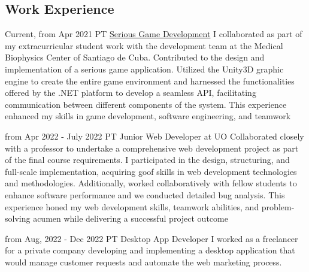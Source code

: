 \documentclass[10pt]{curriculum}
\begin{document}
\begin{paracol}{2}


\section{Work Experience}





\jobentry
	{Current, from Apr 2021} %
	{PT} %
	{} %
	{\href{https://www.cent.uo.edu.cu/cbm/483-2/}{Serious Game Development}} %
	{I collaborated as part of my extracurricular student work with the development team at the Medical Biophysics Center of Santiago de Cuba. Contributed to the design and implementation of a serious game application. Utilized the Unity3D graphic engine to create the entire game environment and harnessed the functionalities offered by the .NET platform to develop a seamless API, facilitating communication between different components of the system. This experience enhanced my skills in game development, software engineering, and teamwork}

\jobentry
	{from Apr 2022 - July 2022} %
	{PT} %
	{}
	{Junior Web Developer at UO}
	{Collaborated closely with a professor to undertake a comprehensive web development project as part of the final course requirements. I participated in the design, structuring, and full-scale implementation, acquiring goof skills in web development technologies and methodologies. Additionally, worked collaboratively with fellow students to enhance software performance and we conducted detailed bug analysis. This experience honed my web development skills, teamwork abilities, and problem-solving acumen while delivering a successful project outcome}

\jobentry
	{from Aug, 2022 - Dec 2022} %
	{PT} %
	{}
	{Desktop App Developer}
	{I worked as a freelancer for a private company developing and implementing a desktop application that would manage customer requests and automate the web marketing process.}


\end{paracol}
\end{document}
